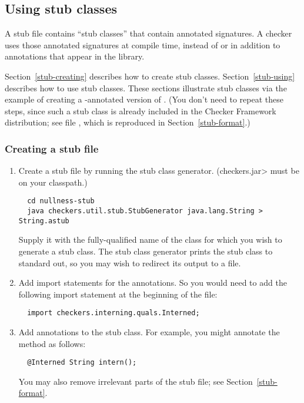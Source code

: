\subsection{Using stub classes\label{stub}\label{stub-creating-and-using}}

A stub file contains ``stub classes'' that contain annotated signatures.  A
checker uses those annotated signatures at compile time, instead of or in
addition to annotations that appear in the library.

Section~\ref{stub-creating} describes how to create stub classes.
Section~\ref{stub-using} describes how to use stub classes.
These sections illustrate stub classes via the example of creating a -annotated
version of .  (You don't need to repeat these steps,
since such a stub class is already included in the Checker Framework
distribution; see file , which
is reproduced in Section~\ref{stub-format}.)


\subsubsection{Creating a stub file\label{stub-creating}}

\begin{enumerate}

\item
  Create a stub file by running the stub class generator.  (\<checkers.jar>
  must be on your classpath.)

\begin{Verbatim}
  cd nullness-stub
  java checkers.util.stub.StubGenerator java.lang.String > String.astub
\end{Verbatim}

  Supply it with the fully-qualified name of the class for which you wish to
  generate a stub class.  The stub class generator prints the
  stub class to standard out, so you may wish to redirect its output to a
  file.

\item
  Add import statements for the annotations.  So you would need to
add the following import statement at the beginning of the file:

\begin{Verbatim}
  import checkers.interning.quals.Interned;
\end{Verbatim}

\item
  Add annotations to the stub class.  For example, you might annotate
  the  method as follows:

\begin{Verbatim}
  @Interned String intern();
\end{Verbatim}

  You may also remove irrelevant parts of the stub file; see
  Section~\ref{stub-format}.

\end{enumerate}


